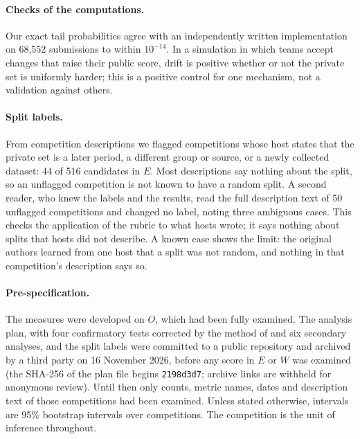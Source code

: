 \documentclass[10pt]{article}
\begin{document}
\paragraph{Checks of the computations.} Our exact tail probabilities agree with an independently written implementation on 68,552 submissions to within $10^{-14}$. In a simulation in which teams accept changes that raise their public score, drift is positive whether or not the private set is uniformly harder; this is a positive control for one mechanism, not a validation against others.

\paragraph{Split labels.} From competition descriptions we flagged competitions whose host states that the private set is a later period, a different group or source, or a newly collected dataset: 44 of 516 candidates in $E$. Most descriptions say nothing about the split, so an unflagged competition is not known to have a random split. A second reader, who knew the labels and the results, read the full description text of 50 unflagged competitions and changed no label, noting three ambiguous cases. This checks the application of the rubric to what hosts wrote; it says nothing about splits that hosts did not describe. A known case shows the limit: the original authors learned from one host that a split was not random, and nothing in that competition's description says so.

\paragraph{Pre-specification.} The measures were developed on $O$, which had been fully examined. The analysis plan, with four confirmatory tests corrected by the method of \citet{holm1979} and six secondary analyses, and the split labels were committed to a public repository and archived by a third party on 16 November 2026, before any score in $E$ or $W$ was examined (the SHA-256 of the plan file begins \texttt{2198d3d7}; archive links are withheld for anonymous review). Until then only counts, metric names, dates and description text of those competitions had been examined. Unless stated otherwise, intervals are 95\% bootstrap intervals over competitions. The competition is the unit of inference throughout.
\end{document}
